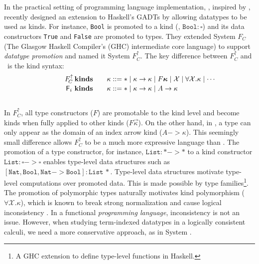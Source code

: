 In the practical setting of programming language implementation,
\citet{YorgeyWCJVM12}, inspired by \citet{SHE}, recently designed an extension
to Haskell's GADTs by allowing datatypes to be used as kinds. For instance,
\texttt{Bool} is promoted to a kind (\ie, $\texttt{Bool}:\square$) and its
data constructors \texttt{True} and \texttt{False} are promoted to types.
They extended System $F_{\!C}$ (The Glasgow Haskell Compiler's
(GHC) intermediate core language) to support \emph{datatype promotion}
and named it System $F_{\!C}^\uparrow$. The key difference between
$F_{\!C}^\uparrow$ and \Fi\ is the kind syntax: %
\vspace*{-2pt}
\[\qquad\quad
\begin{array}{ll}
F_{\!C}^\uparrow\,\textbf{kinds}\quad &
\kappa ::= * \mid \kappa -> \kappa \mid F \vec{\kappa} \mid \mathcal{X} \mid \forall \mathcal{X}.\kappa \mid \cdots \\
\,\Fi\,\,\textbf{kinds}\quad &
\kappa ::= * \mid \kappa -> \kappa \mid A -> \kappa \phantom{A^{A^A}}
\end{array}  
\] ~\vspace*{-6pt}\\
In $F_{\!C}^\uparrow$, all type constructors ($F$) are promotable to the 
kind level and become kinds when fully applied to other kinds
($F\vec\kappa$). On the other hand, in \Fi,  a type can only appear
as the domain of an index arrow kind ($A-> \kappa$). This seemingly small
difference allows $F_{\!C}^\uparrow$ to be a much
more expressive language than \Fi. The promotion of
a type constructor, for instance, $\texttt{List}:* -> *$ to a kind constructor
$\texttt{List}:\square-> \square$ enables type-level data structures
such as $\mathtt{[Nat,Bool,Nat-> Bool]:List\,*}$. Type-level
data structures motivate type-level computations over promoted data.
This is made possible by type families\footnote{
	A GHC extension to define type-level functions in Haskell.}.
The promotion of polymorphic types naturally motivates
kind polymorphism ($\forall \mathcal{X}.\kappa$), which is known to
break strong normalization and cause logical inconsistency \cite{Girard72}.
In a functional {\em programming language},
inconsistency is not an issue. However, when studying
term-indexed datatypes in a logically consistent calculi, we need
a more conservative approach, as in System \Fi.

